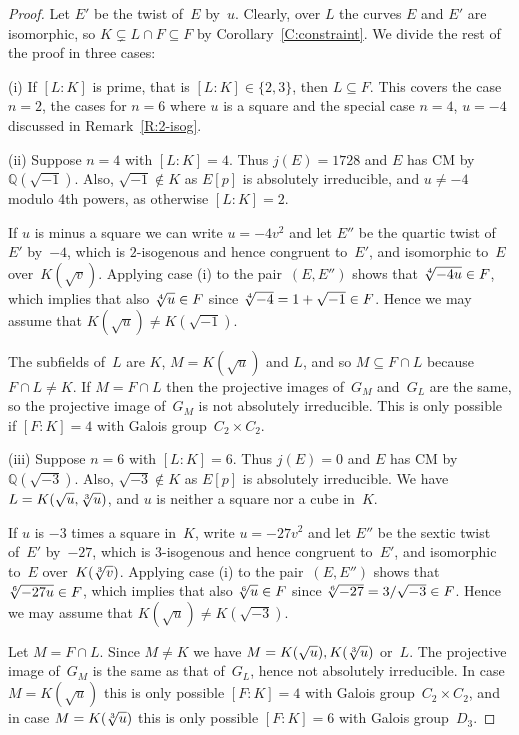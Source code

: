 \documentclass[12pt, reqno]{amsart}
\newcommand{\Q}{\mathbb{Q}}
\numberwithin{equation}{section}
\theoremstyle{definition}
\theoremstyle{remark}
\begin{document}
\begin{proof} 
Let $E'$ be the twist of~$E$ by~$u$. Clearly, over $L$ the curves $E$ and $E'$ are isomorphic, so $K\subsetneq L\cap F\subseteq F$
by Corollary~\ref{C:constraint}.
We divide the rest of the proof in three cases:

(i) If $[L : K]$ is prime, that is $[L : K] \in \{2, 3\}$, then $L \subseteq F$. This covers the case $n=2$, the cases for $n=6$ where $u$ is a square and the special case $n=4$, $u=-4$ discussed in
Remark~\ref{R:2-isog}. 


(ii) Suppose $n=4$ with $[L : K]=4$. Thus $j(E) = 1728$ and $E$ has CM
by~$\Q(\sqrt{-1})$. Also, $\sqrt{-1} \not\in K$ as $E[p]$ is
absolutely irreducible, and $u \neq -4$ modulo 4th powers, as otherwise
$[L:K]=2$.

If $u$ is minus a square we can write $u=-4v^2$ and let $E''$ be the
quartic twist of~$E'$ by~$-4$, which is $2$-isogenous and hence congruent
to~$E'$, and isomorphic to~$E$ over~$K(\sqrt{v})$.  Applying case (i)
to the pair~$(E,E'')$ shows that $\root4\of{-4u}\in F$, which implies
that also $\root4\of{u}\in F$ since $\root4\of{-4}=1+\sqrt{-1}\in F$.
Hence we may assume that $K(\sqrt{u}) \not= K(\sqrt{-1})$.

The subfields of~$L$ are $K$, $M=K(\sqrt{u})$ and $L$, and so $M
\subseteq F \cap L$ because $F \cap L \neq K$.  If $M=F\cap L$ then
the projective images of~$G_M$ and~$G_L$ are the same, so the
projective image of~$G_M$ is not absolutely irreducible.  This is only
possible if $[F:K]=4$ with Galois group~$C_2\times C_2$.


(iii) Suppose $n=6$ with $[L : K]=6$. Thus $j(E) = 0$ and $E$ has CM
by $\Q(\sqrt{-3})$. Also, $\sqrt{-3} \not\in K$ as $E[p]$ is
absolutely irreducible. We have $L = K(\sqrt{u},\root 3 \of u)$, and
$u$ is neither a square nor a cube in~$K$.

If $u$ is $-3$ times a square in~$K$, write $u=-27v^2$ and let $E''$
be the sextic twist of~$E'$ by~$-27$, which is $3$-isogenous and hence
congruent to~$E'$, and isomorphic to~$E$ over~$K(\root3\of{v})$.
Applying case (i) to the pair~$(E,E'')$ shows that $\root6\of{-27u}\in
F$, which implies that also $\root6\of{u}\in F$ since
$\root6\of{-27}=3/\sqrt{-3}\in F$.  Hence we may assume that
$K(\sqrt{u}) \not= K(\sqrt{-3})$.

Let $M = F \cap L$.  Since $M\not=K$ we have $M = K(\sqrt{u}), K(\root
3 \of{u})$ or~$L$.  The projective image of~$G_M$ is the same as that
of~$G_L$, hence not absolutely irreducible.  In case $M=K(\sqrt{u})$
this is only possible $[F:K]=4$ with Galois group~$C_2\times C_2$, and
in case $M=K(\root3\of{u})$ this is only possible $[F:K]=6$ with
Galois group~$D_3$.


\end{proof}
\end{document}
